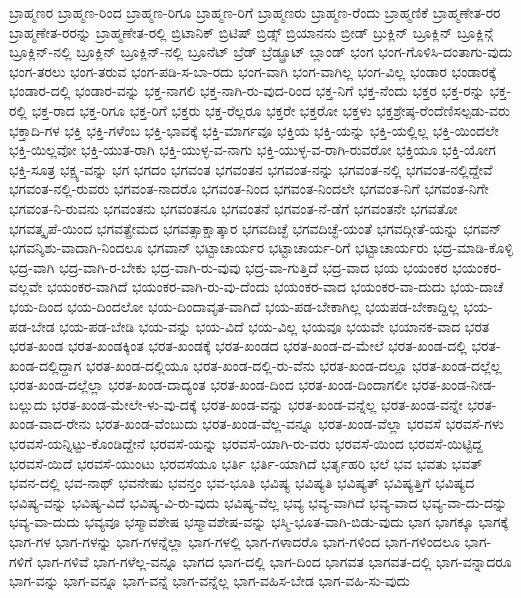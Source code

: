{ಬ್ರಾಹ್ಮಣರ
ಬ್ರಾಹ್ಮಣ-ರಿಂದ
ಬ್ರಾಹ್ಮಣ-ರಿಗೂ
ಬ್ರಾಹ್ಮಣ-ರಿಗೆ
ಬ್ರಾಹ್ಮಣರು
ಬ್ರಾಹ್ಮಣ-ರೆಂದು
ಬ್ರಾಹ್ಮಣಿಕೆ
ಬ್ರಾಹ್ಮಣೇತ-ರರ
ಬ್ರಾಹ್ಮಣೇತ-ರರನ್ನು
ಬ್ರಾಹ್ಮಣೇತ-ರಲ್ಲಿ
ಬ್ರಿಟಾನಿಕ್
ಬ್ರಿಟಿಷ್
ಬ್ರಿಡ್ಸ್
ಬ್ರಿಯಾನನು
ಬ್ರೀಡ್
ಬ್ರುಕ್ಲಿನ್
ಬ್ರೂಕ್ಲಿನ್
ಬ್ರೂಕ್ಲಿನ್ಗೆ
ಬ್ರೂಕ್ಲಿನ್-ನಲ್ಲಿ
ಬ್ರೂಕ್ಲಿನ್
ಬ್ರೂಕ್ಲಿನ್-ನಲ್ಲಿ
ಬ್ರೂನೆಟ್
ಬ್ರೆಡ್
ಬ್ರೆಡ್ಫ್ರೂಟ್
ಬ್ಲಾಂಡ್
ಭಂಗ
ಭಂಗ-ಗೊಳಿಸಿ-ದಂತಾಗು-ವುದು
ಭಂಗ-ತರಲು
ಭಂಗ-ತರುವ
ಭಂಗ-ಪಡಿ-ಸ-ಬಾ-ರದು
ಭಂಗ-ವಾಗಿ
ಭಂಗ-ವಾಗಿಲ್ಲ
ಭಂಗ-ವಿಲ್ಲ
ಭಂಡಾರ
ಭಂಡಾರಕ್ಕೆ
ಭಂಡಾರ-ದಲ್ಲಿ
ಭಂಡಾರ-ವನ್ನು
ಭಕ್ತ-ನಾಗಲಿ
ಭಕ್ತ-ನಾಗಿ-ರು-ವುದ-ರಿಂದ
ಭಕ್ತ-ನಿಗೆ
ಭಕ್ತ-ನೆಂದು
ಭಕ್ತರ
ಭಕ್ತ-ರನ್ನು
ಭಕ್ತ-ರಲ್ಲಿ
ಭಕ್ತ-ರಾದ
ಭಕ್ತ-ರಿಗೂ
ಭಕ್ತ-ರಿಗೆ
ಭಕ್ತರು
ಭಕ್ತ-ರೆಲ್ಲರೂ
ಭಕ್ತರೇ
ಭಕ್ತರೋ
ಭಕ್ತಳು
ಭಕ್ತಶ್ರೇಷ್ಠ-ರೆಂದೆಣಿಸಲ್ಪಡು-ವರು
ಭಕ್ತಾದಿ-ಗಳ
ಭಕ್ತಿ
ಭಕ್ತಿ-ಗಳೆಂಬ
ಭಕ್ತಿ-ಭಾವಕ್ಕೆ
ಭಕ್ತಿ-ಮಾರ್ಗವೂ
ಭಕ್ತಿಯ
ಭಕ್ತಿ-ಯನ್ನು
ಭಕ್ತಿ-ಯಲ್ಲಿಲ್ಲ
ಭಕ್ತಿ-ಯಿಂದಲೇ
ಭಕ್ತಿ-ಯಿಲ್ಲವೋ
ಭಕ್ತಿ-ಯುತ-ರಾಗಿ
ಭಕ್ತಿ-ಯುಳ್ಳ-ವ-ನಾಗು
ಭಕ್ತಿ-ಯುಳ್ಳ-ವ-ರಾಗಿ-ರುವರೋ
ಭಕ್ತಿಯೂ
ಭಕ್ತಿ-ಯೋಗ
ಭಕ್ತಿ-ಸೂತ್ರ
ಭಕ್ಷ್ಯ-ವನ್ನು
ಭಗ
ಭಗದಂ
ಭಗವಂತ
ಭಗವಂತನ
ಭಗವಂತ-ನನ್ನು
ಭಗವಂತ-ನಲ್ಲಿ
ಭಗವಂತ-ನಲ್ಲಿದ್ದೇವೆ
ಭಗವಂತ-ನಲ್ಲಿ-ರುವರು
ಭಗವಂತ-ನಾದರೊ
ಭಗವಂತ-ನಿಂದ
ಭಗವಂತ-ನಿಂದಲೇ
ಭಗವಂತ-ನಿಗೆ
ಭಗವಂತ-ನಿಗೇ
ಭಗವಂತ-ನಿ-ರುವನು
ಭಗವಂತನು
ಭಗವಂತನೂ
ಭಗವಂತನೆ
ಭಗವಂತ-ನೆ-ಡೆಗೆ
ಭಗವಂತನೇ
ಭಗವತೋ
ಭಗವತ್ಕೃಪೆ-ಯಿಂದ
ಭಗವತ್ಪ್ರೇಮದ
ಭಗವತ್ಸಾಕ್ಷಾತ್ಕಾರ
ಭಗವದಿಚ್ಛೆ
ಭಗವದಿಚ್ಛೆ-ಯಂತೆ
ಭಗವದ್ಗೀತೆ-ಯನ್ನು
ಭಗವನ್
ಭಗವನ್ಶಿಶು-ವಾದಾಗಿ-ನಿಂದಲೂ
ಭಗವಾನ್
ಭಟ್ಟಾಚಾರ್ಯರ
ಭಟ್ಟಾಚಾರ್ಯ-ರಿಗೆ
ಭಟ್ಟಾಚಾರ್ಯರು
ಭದ್ರ-ಮಾಡಿ-ಕೊಳ್ಳಿ
ಭದ್ರ-ವಾಗಿ
ಭದ್ರ-ವಾಗಿ-ರ-ಬೇಕು
ಭದ್ರ-ವಾಗಿ-ರು-ವುವು
ಭದ್ರ-ವಾ-ಗುತ್ತಿದೆ
ಭದ್ರ-ವಾದ
ಭಯ
ಭಯಂಕರ
ಭಯಂಕರ-ವಲ್ಲವೇ
ಭಯಂಕರ-ವಾಗಿದೆ
ಭಯಂಕರ-ವಾಗಿ-ರು-ವು-ದೆಂದು
ಭಯಂಕರ-ವಾದ
ಭಯಂಕರ-ವಾ-ದುದು
ಭಯ-ದಾಚೆ
ಭಯ-ದಿಂದ
ಭಯ-ದಿಂದಲೋ
ಭಯ-ದಿಂದಾವೃತ-ವಾಗಿದೆ
ಭಯ-ಪಡ-ಬೇಕಾಗಿಲ್ಲ
ಭಯಪಡ-ಬೇಕಾದ್ದಿಲ್ಲ
ಭಯ-ಪಡ-ಬೇಡ
ಭಯ-ಪಡ-ಬೇಡಿ
ಭಯ-ವನ್ನು
ಭಯ-ವಿದೆ
ಭಯ-ವಿಲ್ಲ
ಭಯವೂ
ಭಯವೇ
ಭಯಾನಕ-ವಾದ
ಭರತ
ಭರತ-ಖಂಡ
ಭರತ-ಖಂಡಕ್ಕಿಂತ
ಭರತ-ಖಂಡಕ್ಕೆ
ಭರತ-ಖಂಡದ
ಭರತ-ಖಂಡ-ದ-ಮೇಲೆ
ಭರತ-ಖಂಡ-ದಲ್ಲಿ
ಭರತ-ಖಂಡ-ದಲ್ಲಿದ್ದಾಗ
ಭರತ-ಖಂಡ-ದಲ್ಲಿಯೂ
ಭರತ-ಖಂಡ-ದಲ್ಲಿ-ರು-ವೆನು
ಭರತ-ಖಂಡ-ದಲ್ಲೂ
ಭರತ-ಖಂಡ-ದಲ್ಲೆಲ್ಲ
ಭರತ-ಖಂಡ-ದಲ್ಲೆಲ್ಲಾ
ಭರತ-ಖಂಡ-ದಾದ್ಯಂತ
ಭರತ-ಖಂಡ-ದಿಂದ
ಭರತ-ಖಂಡ-ದಿಂದಾಗಲೀ
ಭರತ-ಖಂಡ-ನೀಡ-ಬಲ್ಲುದು
ಭರತ-ಖಂಡ-ಮೇಲೇ-ಳು-ವು-ದಕ್ಕೆ
ಭರತ-ಖಂಡ-ವನ್ನು
ಭರತ-ಖಂಡ-ವನ್ನೆಲ್ಲ
ಭರತ-ಖಂಡ-ವನ್ನೇ
ಭರತ-ಖಂಡ-ವಾದ-ರೇನು
ಭರತ-ಖಂಡ-ವೆಂಬುದು
ಭರತ-ಖಂಡ-ವೆಲ್ಲ-ವನ್ನೂ
ಭರತ-ಖಂಡ-ವೆಲ್ಲಾ
ಭರವಸೆ
ಭರವಸೆ-ಗಳು
ಭರವಸೆ-ಯನ್ನಿಟ್ಟು-ಕೊಂಡಿದ್ದೇನೆ
ಭರವಸೆ-ಯನ್ನು
ಭರವಸೆ-ಯಾಗಿ-ರು-ವರು
ಭರವಸೆ-ಯಿಂದ
ಭರವಸೆ-ಯಿಟ್ಟಿದ್ದ
ಭರವಸೆ-ಯಿದೆ
ಭರವಸೆ-ಯುಂಟು
ಭರವಸೆಯೂ
ಭರ್ತಿ
ಭರ್ತಿ-ಯಾಗಿದೆ
ಭರ್ತೃಹರಿ
ಭಲೆ
ಭವ
ಭವತು
ಭವತ್
ಭವನ-ದಲ್ಲಿ
ಭವ-ನಾಥ್
ಭವನೇಷು
ಭವನ್ತಂ
ಭವ-ಭೂತಿ
ಭವಿಷ್ಯ
ಭವಿಷ್ಯತಿ
ಭವಿಷ್ಯತ್
ಭವಿಷ್ಯತ್ತಿಗೆ
ಭವಿಷ್ಯದ
ಭವಿಷ್ಯ-ವನ್ನು
ಭವಿಷ್ಯ-ವಿದೆ
ಭವಿಷ್ಯ-ವಿ-ರು-ವುದು
ಭವಿಷ್ಯ-ವೆಲ್ಲ
ಭವ್ಯ
ಭವ್ಯ-ವಾಗಿದೆ
ಭವ್ಯ-ವಾದ
ಭವ್ಯ-ವಾ-ದು-ದನ್ನು
ಭವ್ಯ-ವಾ-ದುದು
ಭವ್ಯವೂ
ಭಸ್ಮಾವಶೇಷ
ಭಸ್ಮಾವಶೇಷ-ವನ್ನು
ಭಸ್ಮಿ-ಭೂತ-ವಾಗಿ-ಬಿಡು-ವುದು
ಭಾಗ
ಭಾಗಕ್ಕೂ
ಭಾಗಕ್ಕೆ
ಭಾಗ-ಗಳ
ಭಾಗ-ಗಳನ್ನು
ಭಾಗ-ಗಳನ್ನೆಲ್ಲಾ
ಭಾಗ-ಗಳಲ್ಲಿ
ಭಾಗ-ಗಳಾದರೊ
ಭಾಗ-ಗಳಿಂದ
ಭಾಗ-ಗಳಿಂದಲೂ
ಭಾಗ-ಗಳಿಗೆ
ಭಾಗ-ಗಳಿವೆ
ಭಾಗ-ಗಳೆಲ್ಲ-ವನ್ನೂ
ಭಾಗದ
ಭಾಗ-ದಲ್ಲಿ
ಭಾಗ-ದಿಂದ
ಭಾಗವತ
ಭಾಗವತ-ದಲ್ಲಿ
ಭಾಗ-ವನ್ನಾದರೂ
ಭಾಗ-ವನ್ನು
ಭಾಗ-ವನ್ನೂ
ಭಾಗ-ವನ್ನೆ
ಭಾಗ-ವನ್ನೆಲ್ಲ
ಭಾಗ-ವಹಿಸ-ಬೇಡ
ಭಾಗ-ವಹಿ-ಸು-ವುದು
}

